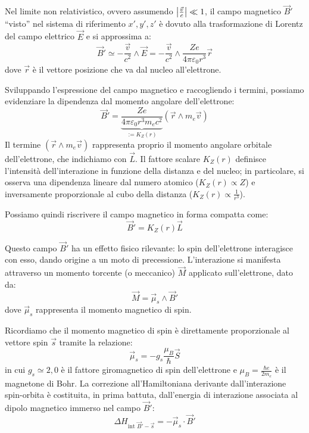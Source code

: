 Nel limite non relativistico, ovvero assumendo \(\abs{\frac{\vec{v}}{c}} \ll 1\), il campo magnetico \(\vec{B}'\) ``visto'' nel sistema di riferimento \(x', y', z'\) è dovuto alla trasformazione di Lorentz del campo elettrico \(\vec{E}\) e si approssima a:
\begin{equation}
    \vec{B}' \simeq -\frac{\vec{v}}{c^2} \wedge \vec{E} = -\frac{\vec{v}}{c^2} \wedge \frac{Ze}{4\pi\varepsilon_0 r^3} \vec{r}
\end{equation}
dove \(\vec{r}\) è il vettore posizione che va dal nucleo all'elettrone.

Sviluppando l'espressione del campo magnetico e raccogliendo i termini, possiamo evidenziare la dipendenza dal momento angolare dell'elettrone:
\begin{equation}
    \vec{B}' = \underbrace{\frac{Ze}{4\pi\varepsilon_0 r^3 m_e c^2}}_{:= K_Z(r)} (\vec{r} \wedge m_e \vec{v})
\end{equation}
Il termine \((\vec{r} \wedge m_e \vec{v})\) rappresenta proprio il momento angolare orbitale dell'elettrone, che indichiamo con \(\vec{L}\). Il fattore scalare \(K_Z(r)\) definisce l'intensità dell'interazione in funzione della distanza e del nucleo; in particolare, si osserva una dipendenza lineare dal numero atomico (\(K_Z(r) \propto Z\)) e inversamente proporzionale al cubo della distanza (\(K_Z(r) \propto \frac{1}{r^3}\)). 

Possiamo quindi riscrivere il campo magnetico in forma compatta come:
\begin{equation}
    \vec{B}' = K_Z(r) \vec{L}
\end{equation}

Questo campo \(\vec{B}'\) ha un effetto fisico rilevante: lo spin dell'elettrone interagisce con esso, dando origine a un moto di precessione. L'interazione si manifesta attraverso un momento torcente (o meccanico) \(\vec{M}\) applicato sull'elettrone, dato da:
\begin{equation}
    \vec{M} = \vec{\mu}_s \wedge \vec{B}'
\end{equation}
dove \(\vec{\mu}_s\) rappresenta il momento magnetico di spin. 

Ricordiamo che il momento magnetico di spin è direttamente proporzionale al vettore spin \(\vec{s}\) tramite la relazione:
\begin{equation}
    \vec{\mu}_s = -g_s \frac{\mu_B}{\hbar} \vec{S}
\end{equation}
in cui \(g_s \simeq 2,0\) è il fattore giromagnetico di spin dell'elettrone e \(\mu_B = \frac{\hbar e}{2m_e}\) è il magnetone di Bohr.
La correzione all'Hamiltoniana derivante dall'interazione spin-orbita è costituita, in prima battuta, dall'energia di interazione associata al dipolo magnetico immerso nel campo \(\vec{B}'\):
\begin{equation}
    \Delta H_{\text{int } \vec{B}'-\vec{s}} = - \vec{\mu}_s \cdot \vec{B}'
\end{equation}

